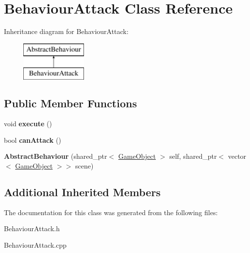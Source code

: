 \hypertarget{class_behaviour_attack}{}\section{Behaviour\+Attack Class Reference}
\label{class_behaviour_attack}
Inheritance diagram for Behaviour\+Attack\+:\begin{figure}[H]
\begin{center}
\leavevmode
\includegraphics[height=2.000000cm]{class_behaviour_attack}
\end{center}
\end{figure}
\subsection*{Public Member Functions}
\begin{DoxyCompactItemize}
\item 
\mbox{\label{class_behaviour_attack_aca669f46a6d32e5e41e7b477be1ee4cf}} 
void {\bfseries execute} ()
\item 
\mbox{\label{class_behaviour_attack_a539f70f642f0b21a808631fc64fbf2d8}} 
bool {\bfseries can\+Attack} ()
\item 
\mbox{\label{class_behaviour_attack_a8a3a9217b3179f949a1d6a32f340c00c}} 
{\bfseries Abstract\+Behaviour} (shared\+\_\+ptr$<$ \mbox{\hyperlink{class_game_object}{Game\+Object}} $>$ self, shared\+\_\+ptr$<$ vector$<$ \mbox{\hyperlink{class_game_object}{Game\+Object}} $>$$>$ scene)
\end{DoxyCompactItemize}
\subsection*{Additional Inherited Members}


The documentation for this class was generated from the following files\+:\begin{DoxyCompactItemize}
\item 
Behaviour\+Attack.\+h\item 
Behaviour\+Attack.\+cpp\end{DoxyCompactItemize}

